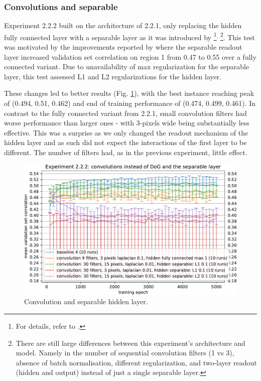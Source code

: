 \subsubsection{Convolutions and separable}

Experiment 2.2.2 built on the architecture of 2.2.1, only replacing the hidden fully connected layer with a separable layer as it was introduced by \cite{klindt}\footnote{For details, refer to .}$^{,\thinspace}$\footnote{There are still large differences between this experiment’s architecture and \cite{klindt} model. Namely in the number of sequential convolution filters (1 vs 3), absence of batch normalisation, different regularization, and two-layer readout (hidden and output) instead of just a single separable layer.}. This test was motivated by the improvements reported by \citeauthor{klindt} where the separable readout layer increased validation set correlation on region 1 from 0.47 to 0.55 over a fully connected variant. Due to unavailability of max regularization for the separable layer, this test assessed L1 and L2 regularizations for the hidden layer.

These changes led to better results (Fig. \ref{fig:5.2.2.2}), with the best instance reaching peak of (0.494, 0.51, 0.462) and end of training performance of (0.474, 0.499, 0.461). In contrast to the fully connected variant from 2.2.1, small convolution filters had worse performance than larger ones - with 3-pixels wide being substantially less effective. This was a surprise as we only changed the readout mechanism of the hidden layer and as such did not expect the interactions of the first layer to be different. The number of filters had, as in the previous experiment, little effect.

\begin{figure}[H]
    \centering
    \includegraphics[width=1\textwidth]{../figures/05_2_2_2}
    \caption[Experiment 2.2.2]{Convolution and separable hidden layer.}
    \label{fig:5.2.2.2}
\end{figure}

